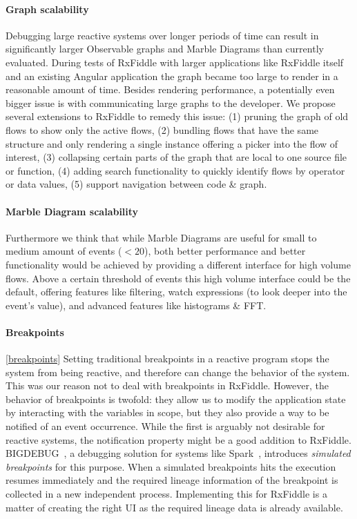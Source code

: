 \paragraph{Graph scalability}
Debugging large reactive systems over longer periods of time can result in significantly larger Observable graphs and Marble Diagrams than currently evaluated. During tests of RxFiddle with larger applications like RxFiddle itself and an existing Angular application the graph became too large to render in a reasonable amount of time. Besides rendering performance, a potentially even bigger issue is with communicating large graphs to the developer. We propose several extensions to RxFiddle to remedy this issue: (1) pruning the graph of old flows to show only the active flows, (2) bundling flows that have the same structure and only rendering a single instance offering a picker into the flow of interest, (3) collapsing certain parts of the graph that are local to one source file or function, (4) adding search functionality to quickly identify flows by operator or data values, (5) support navigation between code \& graph.

\paragraph{Marble Diagram scalability}
Furthermore we think that while Marble Diagrams are useful for small to medium amount of events ($< 20$), both better performance and better functionality would be achieved by providing a different interface for high volume flows. Above a certain threshold of events this high volume interface could be the default, offering features like filtering, watch expressions (to look deeper into the event's value), and advanced features like histograms \& FFT.

\paragraph{Breakpoints}
\ref{breakpoints}
Setting traditional breakpoints in a reactive program stops the system from being reactive, and therefore can change the behavior of the system. This was our reason not to deal with breakpoints in RxFiddle. However, the behavior of breakpoints is twofold: they allow us to modify the application state by interacting with the variables in scope, but they also provide a way to be notified of an event occurrence. While the first is arguably not desirable for reactive systems, the notification property might be a good addition to RxFiddle. BIGDEBUG~\cite{Gulzar2016}, a debugging solution for systems like Spark~\cite{zaharia2012resilient}, introduces \textit{simulated breakpoints} for this purpose. When a simulated breakpoints hits the execution resumes immediately and the required lineage information of the breakpoint is collected in a new independent process. Implementing this for RxFiddle is a matter of creating the right UI as the required lineage data is already available.
